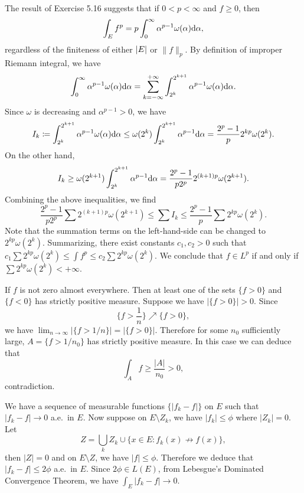 \begin{exercise}{5.18}  The result of Exercise 5.16 suggests that if $0 < p < \infty$ and $f \ge 0$, then
  \[
    \int_E f^p = p \int_0^{\infty} \alpha^{p-1} \omega(\alpha) \mathrm{d} \alpha,
  \]
  regardless of the finiteness of either $\left\vert E\right\vert$ or $\lVert f \rVert_p$.
  By definition of improper Riemann integral, we have
  \[
    \int_0^\infty \alpha^{p-1} \omega(\alpha) \mathrm{d} \alpha =
    \sum_{k = -\infty}^{+\infty}
    \int_{2^k}^{2^{k+1}} \alpha^{p-1} \omega(\alpha) \mathrm{d} \alpha.
  \]
  Since $\omega$ is decreasing and $\alpha^{p-1} > 0$,
  we have
  \[
    I_k \coloneqq \int_{2^k}^{2^{k+1}} \alpha^{p-1} \omega(\alpha) \mathrm{d} \alpha
    \le \omega(2^k) \int_{2^k}^{2^{k+1}} \alpha^{p-1} \mathrm{d} \alpha
    = \frac{2^p-1}{p} 2^{kp} \omega(2^k).
  \]
  On the other hand,
  \[
    I_k \ge \omega(2^{k+1}) \int_{2^k}^{2^{k+1}} \alpha^{p-1} \mathrm{d} \alpha
    = \frac{2^p-1}{p 2^p} 2^{(k+1)p} \omega(2^{k+1}).
  \]
  Combining the above inequalities, we find
  \[
    \frac{2^p-1}{p 2^p}
    \sum 2^{(k+1)p} \omega(2^{k+1})
    \le \sum I_k
    \le \frac{2^p-1}{p} \sum 2^{kp} \omega(2^k).
  \]
  Note that the summation terms on the left-hand-side
  can be changed to $2^{kp} \omega(2^k)$.
  Summarizing, there exist constants $c_1, c_2 > 0$ such that
  $c_1 \sum 2^{kp} \omega(2^k) \le \int f^p \le c_2 \sum 2^{kp} \omega(2^k)$.
  We conclude that $f \in L^p$ if and only if $\sum 2^{kp} \omega(2^k) < + \infty$.
\end{exercise}


\begin{exercise}{5.21}
  If $f$ is not zero almost everywhere.
  Then at least one of the sets $\{f>0\}$ and $\{f<0\}$ has strictly positive measure.
  Suppose we have $|\{f>0\}|>0$.
  Since \[\{f>\frac{1}{n}\}\nearrow\{f>0\},\]
  we have $\lim_{n\rightarrow\infty}|\{f>1/n\}|=|\{f>0\}|$.
  Therefore for some $n_0$ sufficiently large,
  $A=\{f>1/n_0\}$ has strictly positive measure.
  In this case we can deduce that\[\int_A f\geq\frac{|A|}{n_0}>0, \] contradiction.
\end{exercise}

\begin{exercise}{5.22}
  We have a sequence of measurable functions $\{|f_k-f|\}$ on $E$
  such that $|f_k-f|\rightarrow 0$ a.e.\ in $E$.
  Now suppose on $E\setminus Z_k$, we have $|f_k|\leq \phi$ where $|Z_k|=0$.
  Let \[Z=\bigcup_k Z_k\cup\{x\in E:f_k(x)\not\rightarrow f(x)\},\]
  then $|Z|=0$ and on $E\setminus Z$,
  we have $|f|\leq \phi$.
  Therefore we deduce that $|f_k-f|\leq 2\phi$ a.e.\ in $E$.
  Since $2\phi\in L(E)$, from Lebesgue's Dominated Convergence Theorem,
  we have $\int_E|f_k-f|\rightarrow 0.$
\end{exercise}

